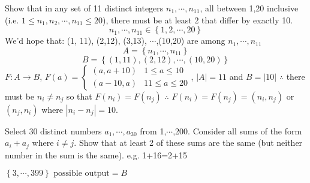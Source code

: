 \begin{example}
Show that in any set of 11 distinct integers $n_1,\cdots,n_{11}$, all between 1,20 inclusive (i.e. $1\le n_1,n_2,\cdots,n_{11} \le 20$), there must be at least 2 that differ by exactly 10.
\[ n_1,\cdots,n_{11}\in \left\{ 1,2,\cdots,20\right\} \]
We'd hope that: (1, 11), (2,12), (3,13), $\cdots$,(10,20) are among $n_1,\cdots,n_{11}$
\[ A = \left\{ n_1,\cdots,n_{11}\right\} \]
\[ B = \left\{ (1,11),(2,12),\cdots,(10,20) \right\} \]
$F:A\to B$, $F(a)=\left\{ \begin{matrix} (a,a+10) & 1 \le a \le 10\\ (a-10,a) & 11\le a \le 20\end{matrix}\right.$, $|A|=11$ and $B=|10|$ $\therefore$ there must be $n_i \neq n_j$ so that $F(n_i)=F(n_j)$ $\therefore$ $F(n_i)=F(n_j)=(n_i,n_j)$ or $(n_j,n_i)$ where $|n_i-n_j|=10$.
\end{example}
\begin{example}
Select 30 distinct numbers $a_1,\cdots,a_{30}$ from 1,$\cdots$,200. Consider all sums of the form $a_i+a_j$ where $i\neq j$. Show that at least 2 of these sums are the same (but neither number in the sum is the same). e.g. 1+16=2+15

$\left\{ 3,\cdots,399 \right\} \text{ possible output} = B$
\end{example}


